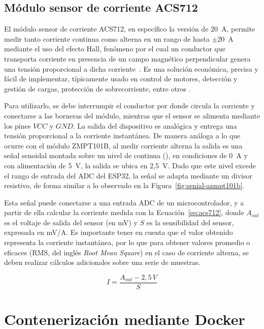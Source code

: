 \subsection{Módulo sensor de corriente ACS712}
El módulo sensor de corriente ACS712, en específico la versión de 20~A, permite medir tanto corriente continua como alterna en un rango de hasta $\pm$20~A mediante el uso del efecto Hall, fenómeno por el cual un conductor que transporta corriente en presencia de un campo magnético perpendicular genera una tensión proporcional a dicha corriente~\cite{hall_effect}. Es una solución económica, precisa y fácil de implementar, típicamente usado en control de motores, detección y gestión de cargas, protección de sobrecorriente, entre otros \cite{acs712_datasheet}.

Para utilizarlo, se debe interrumpir el conductor por donde circula la corriente y conectarse a las borneras del módulo, mientras que el sensor se alimenta mediante los pines $VCC$ y $GND$. La salida del dispositivo es analógica y entrega una tensión proporcional a la corriente instantánea. De manera análoga a lo que ocurre con el módulo ZMPT101B, al medir corriente alterna la salida es una señal senoidal montada sobre un nivel de continua (), en condiciones de 0~A y con alimentación de 5~V, la salida se ubica en 2,5~V. Dado que este nivel excede el rango de entrada del ADC del ESP32, la señal se adapta mediante un divisor resistivo, de forma similar a lo observado en la Figura~\ref{fig:senial-azmpt101b}. 

Esta señal puede conectarse a una entrada ADC de un microcontrolador, y a partir de ella calcular la corriente medida con la Ecuación~\ref{eq:acs712}, donde $A_{out}$ es el voltaje de salida del sensor (en mV) y $S$ es la sensibilidad del sensor, expresada en mV/A. Es importante tener en cuenta que el valor obtenido representa la corriente instantánea, por lo que para obtener valores promedio o eficaces (RMS, del inglés \textit{Root Mean Square}) en el caso de corriente alterna, se deben realizar cálculos adicionales sobre una serie de muestras.

\begin{equation}
    I = \frac{A_{out} - 2{,}5\,V}{S}
    \label{eq:acs712}
\end{equation}


\section{Contenerización mediante Docker}
\label{sec:docker}

